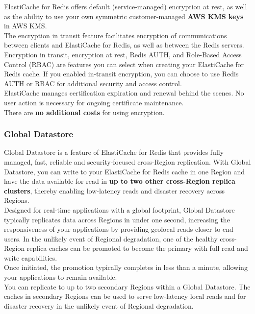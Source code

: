 \documentclass[12pt, letterpaper, twoside]{article}
\begin{document}
ElastiCache for Redis offers default (service-managed) encryption at rest, as well as the ability to use your own symmetric 
customer-managed \textbf{AWS KMS keys} in AWS KMS.\\

The encryption in transit feature facilitates encryption of communications between clients and ElastiCache for Redis, as well as 
between the Redis servers.\\

Encryption in transit, encryption at rest, Redis AUTH, and Role-Based Access Control (RBAC) are features you can select when creating 
your ElastiCache for Redis cache. If you enabled in-transit encryption, you can choose to use Redis AUTH or RBAC for additional 
security and access control.\\

ElastiCache manages certification expiration and renewal behind the scenes. No user action is necessary for ongoing certificate 
maintenance.\\

There are \textbf{no additional costs} for using encryption.\\

\subsubsection{Global Datastore}
Global Datastore is a feature of ElastiCache for Redis that provides fully managed, fast, reliable and security-focused cross-Region 
replication. With Global Datastore, you can write to your ElastiCache for Redis cache in one Region and have the data available for 
read in \textbf{up to two other cross-Region replica clusters}, thereby enabling low-latency reads and disaster recovery across Regions.\\

Designed for real-time applications with a global footprint, Global Datastore typically replicates data across Regions in under one 
second, increasing the responsiveness of your applications by providing geolocal reads closer to end users. In the unlikely event of 
Regional degradation, one of the healthy cross-Region replica caches can be promoted to become the primary with full read and write 
capabilities.\\
Once initiated, the promotion typically completes in less than a minute, allowing your applications to remain available.\\

You can replicate to up to two secondary Regions within a Global Datastore. The caches in secondary Regions can be used to serve 
low-latency local reads and for disaster recovery in the unlikely event of Regional degradation.\\
\end{document}

